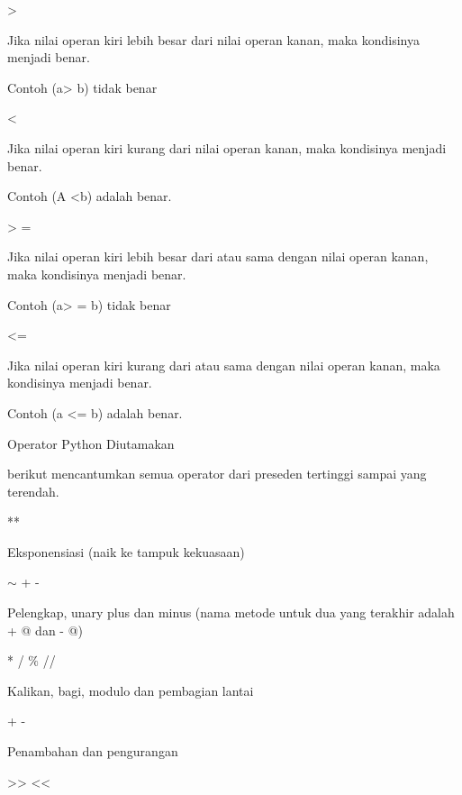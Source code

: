 \noindent 
> \par
\noindent 
Jika nilai operan kiri lebih besar dari nilai operan kanan, maka kondisinya menjadi benar. \par
\noindent 
Contoh (a> b) tidak benar \par
\vspace{12pt}
\noindent 
< \par
\noindent 
Jika nilai operan kiri kurang dari nilai operan kanan, maka kondisinya menjadi benar. \par
\noindent 
Contoh (A <b) adalah benar. \par
\vspace{12pt}
\noindent 
> = \par
\noindent 
Jika nilai operan kiri lebih besar dari atau sama dengan nilai operan kanan, maka kondisinya menjadi benar. \par
\noindent 
Contoh (a> = b) tidak benar \par
\vspace{12pt}
\noindent 
<= \par
\noindent 
Jika nilai operan kiri kurang dari atau sama dengan nilai operan kanan, maka kondisinya menjadi benar. \par
\noindent 
Contoh (a <= b) adalah benar. \par
\noindent 
Operator Python Diutamakan \par
\vspace{12pt}
\noindent 
 berikut mencantumkan semua operator dari preseden tertinggi sampai yang terendah. \par
\vspace{12pt}
\noindent 
** \par
\noindent 
Eksponensiasi (naik ke tampuk kekuasaan) \par
\vspace{12pt}
\noindent 
 $  \sim  $ + - \par
\noindent 
Pelengkap, unary plus dan minus (nama metode untuk dua yang terakhir adalah + @ dan - @) \par
\vspace{12pt}
\noindent 
* / $  \%  $ // \par
\noindent 
Kalikan, bagi, modulo dan pembagian lantai \par
\vspace{12pt}
\noindent 
+ - \par
\noindent 
Penambahan dan pengurangan \par
\vspace{12pt}
\noindent 
>> << \par
